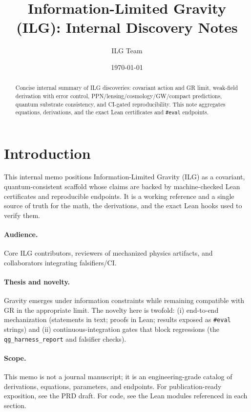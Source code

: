 \documentclass[11pt]{article}
\title{Information-Limited Gravity (ILG): Internal Discovery Notes}
\author{ILG Team}
\date{\today}
\begin{document}
\maketitle

\begin{abstract}
Concise internal summary of ILG discoveries: covariant action and GR limit, weak-field derivation with error control, PPN/lensing/cosmology/GW/compact predictions, quantum substrate consistency, and CI-gated reproducibility. This note aggregates equations, derivations, and the exact Lean certificates and \texttt{\#eval} endpoints.
\end{abstract}

\section{Introduction}
This internal memo positions Information-Limited Gravity (ILG) as a covariant, quantum-consistent scaffold whose claims are backed by machine-checked Lean certificates and reproducible endpoints. It is a working reference and a single source of truth for the math, the derivations, and the exact Lean hooks used to verify them.

\paragraph{Audience.} Core ILG contributors, reviewers of mechanized physics artifacts, and collaborators integrating falsifiers/CI.

\paragraph{Thesis and novelty.} Gravity emerges under information constraints while remaining compatible with GR in the appropriate limit. The novelty here is twofold: (i) end-to-end mechanization (statements in text; proofs in Lean; results exposed as \texttt{\#eval} strings) and (ii) continuous-integration gates that block regressions (the \texttt{qg\_harness\_report} and falsifier checks).

\paragraph{Scope.} This memo is not a journal manuscript; it is an engineering-grade catalog of derivations, equations, parameters, and endpoints. For publication-ready exposition, see the PRD draft. For code, see the Lean modules referenced in each section.
\end{document}

